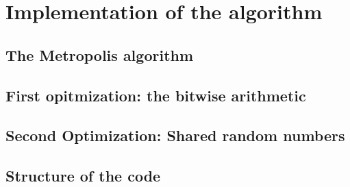\section{Implementation of the algorithm}
\subsection{The Metropolis algorithm}
\subsection{First opitmization: the bitwise arithmetic}
\subsection{Second Optimization: Shared random numbers}
\subsection{Structure of the code}